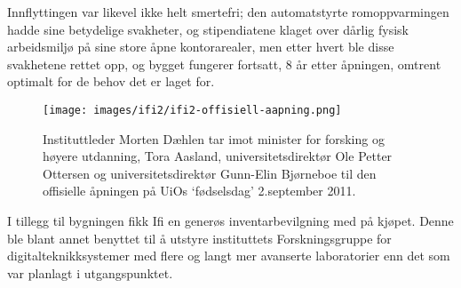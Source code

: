 Innflyttingen var likevel ikke helt smertefri; den automatstyrte romoppvarmingen hadde sine betydelige svakheter, og stipendiatene klaget over dårlig fysisk arbeidsmiljø på sine store åpne kontorarealer, men etter hvert ble disse svakhetene rettet opp, og bygget fungerer fortsatt, 8 år etter åpningen, omtrent optimalt for de behov det er laget for.

\begin{figure}[h!]
	\texttt{[image: images/ifi2/ifi2-offisiell-aapning.png]}
	\caption{Instituttleder Morten Dæhlen tar imot minister for forsking og høyere utdanning, Tora Aasland, universitetsdirektør Ole Petter Ottersen og universitetsdirektør Gunn-Elin Bjørneboe til den offisielle åpningen på UiOs `fødselsdag' 2.september 2011.}
\end{figure}

I tillegg til bygningen fikk Ifi en generøs inventarbevilgning med på kjøpet. Denne ble blant annet benyttet til å utstyre instituttets Forskningsgruppe for digitalteknikksystemer med flere og langt mer avanserte laboratorier enn det som var planlagt i utgangspunktet.
